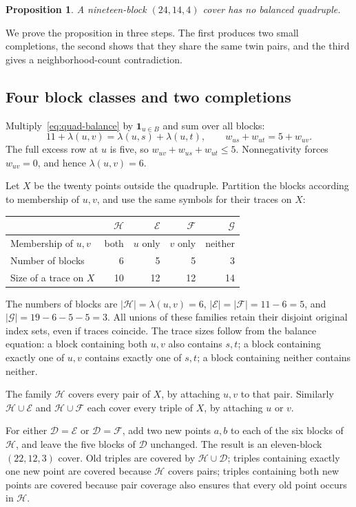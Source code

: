 \documentclass[11pt,letterpaper]{article}
\newtheorem{proposition}[theorem]{Proposition}
\theoremstyle{definition}\newtheorem{definition}[theorem]{Definition}
\theoremstyle{remark}\newtheorem{remark}[theorem]{Remark}
\newcommand{\one}{\mathbf 1}
\newcommand{\calF}{\mathcal F}
\newcommand{\calH}{\mathcal H}
\newcommand{\calE}{\mathcal E}
\newcommand{\calG}{\mathcal G}
\newcommand{\calD}{\mathcal D}
\newcommand{\lam}{\lambda}
\begin{document}
\begin{proposition}\label{prop:noquad}
A nineteen-block $(24,14,4)$ cover has no balanced quadruple.
\end{proposition}
We prove the proposition in three steps. The first produces two small completions, the second shows that they share the same twin pairs, and the third gives a neighborhood-count contradiction.

\subsection{Four block classes and two completions}
Multiply~\eqref{eq:quad-balance} by $\one_{u\in B}$ and sum over all blocks:
\[
 11+\lam(u,v)=\lam(u,s)+\lam(u,t),
 \qquad w_{us}+w_{ut}=5+w_{uv}.
\]
The full excess row at $u$ is five, so $w_{uv}+w_{us}+w_{ut}\le5$. Nonnegativity forces $w_{uv}=0$, and hence $\lam(u,v)=6$.

Let $X$ be the twenty points outside the quadruple. Partition the blocks according to membership of $u,v$, and use the same symbols for their traces on $X$:
\begin{center}
\begin{tabular}{@{}lrrrr@{}}
\toprule
 & $\calH$ & $\calE$ & $\calF$ & $\calG$\\
\midrule
Membership of $u,v$ & both & $u$ only & $v$ only & neither\\
Number of blocks & 6 & 5 & 5 & 3\\
Size of a trace on $X$ & 10 & 12 & 12 & 14\\
\bottomrule
\end{tabular}
\end{center}
The numbers of blocks are $|\calH|=\lam(u,v)=6$, $|\calE|=|\calF|=11-6=5$, and $|\calG|=19-6-5-5=3$. All unions of these families retain their disjoint original index sets, even if traces coincide. The trace sizes follow from the balance equation: a block containing both $u,v$ also contains $s,t$; a block containing exactly one of $u,v$ contains exactly one of $s,t$; a block containing neither contains neither.

The family $\calH$ covers every pair of $X$, by attaching $u,v$ to that pair. Similarly $\calH\cup\calE$ and $\calH\cup\calF$ each cover every triple of $X$, by attaching $u$ or $v$.

For either $\calD=\calE$ or $\calD=\calF$, add two new points $a,b$ to each of the six blocks of $\calH$, and leave the five blocks of $\calD$ unchanged. The result is an eleven-block $(22,12,3)$ cover. Old triples are covered by $\calH\cup\calD$; triples containing exactly one new point are covered because $\calH$ covers pairs; triples containing both new points are covered because pair coverage also ensures that every old point occurs in $\calH$.
\end{document}

